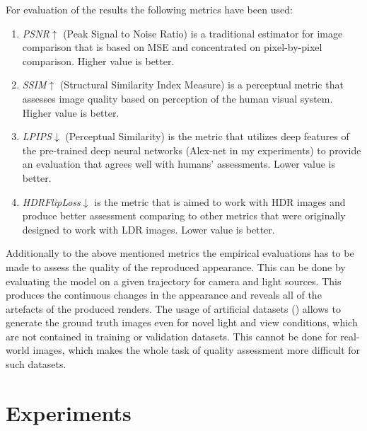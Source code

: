 For evaluation of the results the following metrics have been used:
\begin{enumerate}
    \item \textit{PSNR}$\uparrow$ \cite{hore2010image} (Peak Signal to Noise Ratio) is a traditional estimator for image comparison
    that is based on MSE and concentrated on pixel-by-pixel comparison.
    Higher value is better.
    \item \textit{SSIM}$\uparrow$ \cite{zhou2004image, nilsson2020understanding, hore2010image} (Structural Similarity Index Measure) is a perceptual metric
    that assesses image quality based on perception of the human visual system.
    Higher value is better.
    \item \textit{LPIPS}$\downarrow$ \cite{zhang2018perceptual} (Perceptual Similarity) is the metric
    that utilizes deep features of the pre-trained deep neural networks (Alex-net \cite{krizhevsky2012imagenet} in my experiments)
    to provide an evaluation that agrees well with humans' assessments.
    Lower value is better.
    \item \textit{HDRFlipLoss}$\downarrow$ \cite{theisel2021hdrflip, andersson2020flip} is the metric
    that is aimed to work with HDR images and produce better assessment comparing to other metrics
    that were originally designed to work with LDR images.
    Lower value is better.
\end{enumerate}

Additionally to the above mentioned metrics the empirical evaluations has to be made
to assess the quality of the reproduced appearance.
This can be done by evaluating the model on a given trajectory for camera and light sources.
This produces the continuous changes in the appearance and reveals all of the artefacts of the produced renders.
The usage of artificial datasets () allows to generate the ground truth images
even for novel light and view conditions, which are not contained in training or validation datasets.
This cannot be done for real-world images, which makes the whole task of quality assessment more difficult for such datasets.


\section{Experiments}

